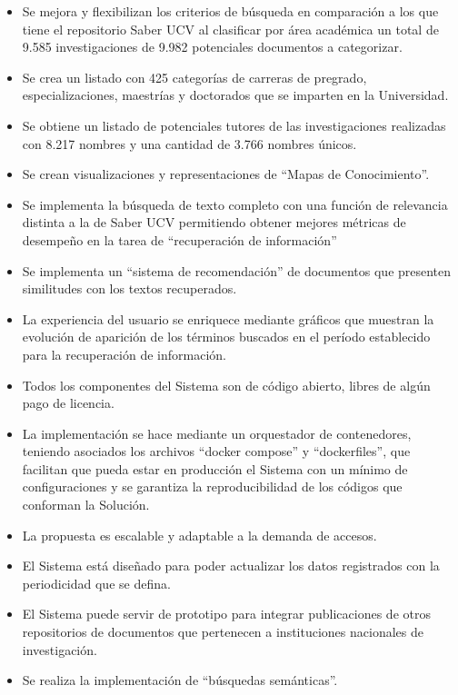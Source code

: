 \documentclass[
  12pt,
  openany]{book}
\begin{document}
\begin{itemize}
\item
  Se mejora y flexibilizan los criterios de búsqueda en comparación a los que tiene el repositorio Saber UCV al clasificar por área académica un total de 9.585 investigaciones de 9.982 potenciales documentos a categorizar.
\item
  Se crea un listado con 425 categorías de carreras de pregrado, especializaciones, maestrías y doctorados que se imparten en la Universidad.
\item
  Se obtiene un listado de potenciales tutores de las investigaciones realizadas con 8.217 nombres y una cantidad de 3.766 nombres únicos.
\item
  Se crean visualizaciones y representaciones de ``Mapas de Conocimiento''.
\item
  Se implementa la búsqueda de texto completo con una función de relevancia distinta a la de Saber UCV permitiendo obtener mejores métricas de desempeño en la tarea de ``recuperación de información''
\item
  Se implementa un ``sistema de recomendación'' de documentos que presenten similitudes con los textos recuperados.
\item
  La experiencia del usuario se enriquece mediante gráficos que muestran la evolución de aparición de los términos buscados en el período establecido para la recuperación de información.
\item
  Todos los componentes del Sistema son de código abierto, libres de algún pago de licencia.
\item
  La implementación se hace mediante un orquestador de contenedores, teniendo asociados los archivos ``docker compose'' y ``dockerfiles'', que facilitan que pueda estar en producción el Sistema con un mínimo de configuraciones y se garantiza la reproducibilidad de los códigos que conforman la Solución.
\item
  La propuesta es escalable y adaptable a la demanda de accesos.
\item
  El Sistema está diseñado para poder actualizar los datos registrados con la periodicidad que se defina.
\item
  El Sistema puede servir de prototipo para integrar publicaciones de otros repositorios de documentos que pertenecen a instituciones nacionales de investigación.
\item
  Se realiza la implementación de ``búsquedas semánticas''.
\end{itemize}
\end{document}
